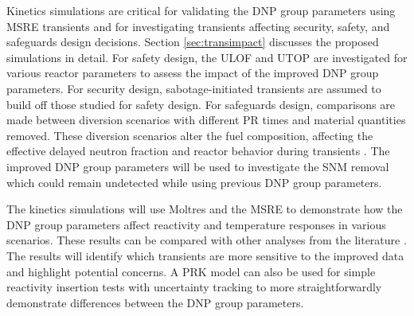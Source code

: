 Kinetics simulations are critical for validating the \gls{DNP} group parameters using \gls{MSRE} transients and for investigating transients affecting security, safety, and safeguards design decisions.
Section \ref{sec:transimpact} discusses the proposed simulations in detail.
For safety design, the \gls{ULOF} and \gls{UTOP} are investigated for various reactor parameters to assess the impact of the improved \gls{DNP} group parameters.
For security design, sabotage-initiated transients are assumed to build off those studied for safety design.
For safeguards design, comparisons are made between diversion scenarios with different \gls{PR} times and material quantities removed.
These diversion scenarios alter the fuel composition, affecting the effective delayed neutron fraction and reactor behavior during transients \cite{wheeler2021signatures}.
The improved \gls{DNP} group parameters will be used to investigate the \gls{SNM} removal which could remain undetected while using previous \gls{DNP} group parameters.

The kinetics simulations will use Moltres and the \gls{MSRE} to demonstrate how the \gls{DNP} group parameters affect reactivity and temperature responses in various scenarios.
These results can be compared with other analyses from the literature \cite{ho2023exploring, singh2018nonlinear}.
The results will identify which transients are more sensitive to the improved data and highlight potential concerns.
A \gls{PRK} model can also be used for simple reactivity insertion tests with uncertainty tracking to more straightforwardly demonstrate differences between the \gls{DNP} group parameters.
